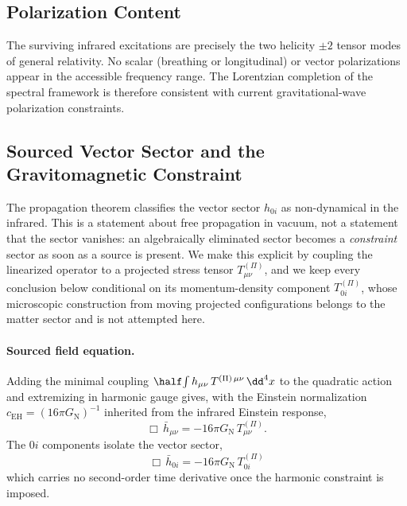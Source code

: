 \subsection{Polarization Content}
  \label{subsec:polarization-content}

  The surviving infrared excitations are precisely the two helicity $\pm 2$ tensor modes of general relativity.
  No scalar (breathing or longitudinal) or vector polarizations appear in the accessible frequency range.
  The Lorentzian completion of the spectral framework is therefore
  consistent with current gravitational-wave polarization constraints.

  \subsection{Sourced Vector Sector and the Gravitomagnetic Constraint}
    \label{subsec:sourced-vector-sector}

    The propagation theorem classifies the vector sector $h_{0i}$ as non-dynamical in the infrared.
    This is a statement about free propagation in vacuum, not a statement that the sector vanishes:
    an algebraically eliminated sector becomes a \emph{constraint} sector as soon as a source is present.
    We make this explicit by coupling the linearized operator to a projected stress tensor $T^{(\Pi)}_{\mu\nu}$,
    and we keep every conclusion below conditional on its momentum-density component $T^{(\Pi)}_{0i}$, whose
    microscopic construction from moving projected configurations belongs to the matter sector and is not
    attempted here.

    \paragraph{Sourced field equation.}
      Adding the minimal coupling $\half\!\int h_{\mu\nu}\,T^{(\Pi)\,\mu\nu}\,\dd^4 x$ to the quadratic action and
      extremizing in harmonic gauge gives, with the Einstein normalization
      $c_{\mathrm{EH}} = (16\pi G_{\mathrm{N}})^{-1}$ inherited from the infrared Einstein response,
      \[
        \Box\,\bar h_{\mu\nu} = -16\pi G_{\mathrm{N}}\, T^{(\Pi)}_{\mu\nu}.
      \]
      The $0i$ components isolate the vector sector,
      \[
        \boxed{\;\Box\,\bar h_{0i} = -16\pi G_{\mathrm{N}}\, T^{(\Pi)}_{0i}\;}
      \]
      which carries no second-order time derivative once the harmonic constraint is imposed.

